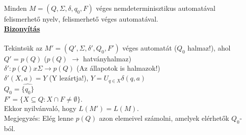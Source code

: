 \documentclass{beamer}
\newcommand{\msmallskip}{\vspace{0.3em}}
\newcommand{\mmedskip}{\vspace{0.5em}}
\begin{document}
\begin{frame}
\begin{tcolorbox}[title={Tétel: Nemdeterminisztikus automata}]
Minden $M = (Q, \Sigma , \delta , q_0, F)$ véges nemdeterminisztikus automatával felismerhető nyelv, felismerhető véges automatával.\\
\tcblower
\msmallskip
\underline{\textbf{Bizonyítás}}\\
\mmedskip
\\
Tekintsük az $M' = (Q', \Sigma , {\delta}', Q_0, F')$ véges automatát ($Q_0$ halmaz!), ahol\\
$Q' = p(Q)$ ($p(Q)$ $\rightarrow$ hatványhalmaz)\\
${\delta}' : p(Q) x \Sigma \rightarrow p(Q)$ (Az állapotok is halmazok!)\\
${\delta}'(X, a) = \widehat{Y}$ (Y lezártja!), $Y = U_{q \in X} \delta(q, a)$\\
$Q_0 = \widehat{\{q_0\}}$\\
$F' = \{X \subseteq Q : X \cap F \neq \emptyset \}$.\\
Ekkor nyilvánvaló, hogy $L(M') = L(M)$.\\
Megjegyzés: Elég lenne $p(Q)$ azon elemeivel számolni, amelyek elérhetők $Q_0$-ból.

\end{tcolorbox}

\end{frame}
\end{document}
